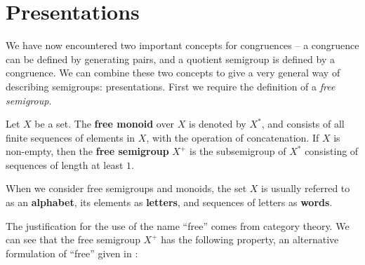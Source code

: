 \section{Presentations}
\label{sec:intro-presentations}

We have now encountered two important concepts for congruences -- a congruence
can be defined by generating pairs, and a quotient semigroup is defined by a
congruence.  We can combine these two concepts to give a very general way of
describing semigroups: presentations.  First we require the definition of a
\textit{free semigroup}.

\begin{definition}
  \label{def:free}
  Let $X$ be a set.  The \textbf{free monoid} over $X$ is denoted by $X^*$, and
  consists of all finite sequences of elements in $X$, with the operation of
  concatenation.  If $X$ is non-empty, then the \textbf{free semigroup} $X^+$ is the subsemigroup of $X^*$
  consisting of sequences of length at least $1$.
\end{definition}

When we consider free semigroups and monoids, the set $X$ is usually referred to
as an \textbf{alphabet}, its elements as \textbf{letters}, and sequences of
letters as \textbf{words}.
  

The justification for the use of the name ``free'' comes from category theory.
We can see that the free semigroup $X^+$ has the following property, an
alternative formulation of ``free'' given in \cite[\S 1.6]{howie}:

